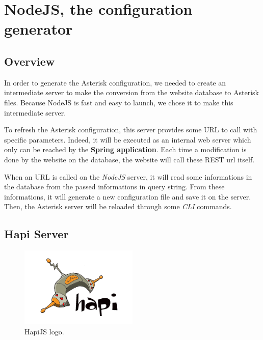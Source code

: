\chapter{NodeJS, the configuration generator}
\section{Overview}

In order to generate the Asterisk configuration, we needed to create an intermediate server to make the conversion from the website database to Asterisk files. Because NodeJS is fast and easy to launch, we chose it to make this intermediate server. \newline

To refresh the Asterisk configuration, this server provides some URL to call with specific parameters. Indeed, it will be executed as an internal web server which only can be reached by the \textbf{Spring application}. Each time a modification is done by the website on the database, the website will call these REST url itself. \newline

When an URL is called on the \textit{NodeJS} server, it will read some informations in the database from the passed informations in query string. From these informations, it will generate a new configuration file and save it on the server. Then, the Asterisk server will be reloaded through some \textit{CLI} commands.

\section{Hapi Server}

\begin{figure}[!ht]
  \caption{HapiJS logo.}
  \centering
    \includegraphics[width=0.5\textwidth]{img/hapijs}
\end{figure}


